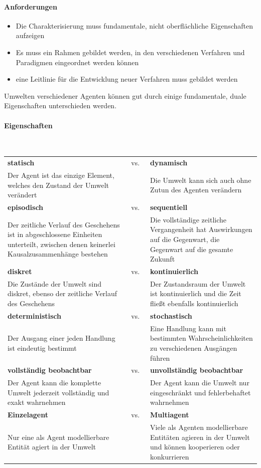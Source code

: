 \paragraph{Anforderungen}
\begin{itemize}
	\item Die Charakterisierung muss fundamentale, nicht oberflächliche Eigenschaften aufzeigen
	\item Es muss ein Rahmen gebildet werden, in den verschiedenen Verfahren und Paradigmen eingeordnet werden können
	\item eine Leitlinie für die Entwicklung neuer Verfahren muss gebildet werden
\end{itemize}
Umwelten verschiedener Agenten können gut durch einige fundamentale, duale Eigenschaften unterschieden werden.
\paragraph{Eigenschaften} \mbox{}
\vspace{1em} \\
\begin{tabular}{p{} p{} p{}}
\textbf{statisch} & \centering vs.\ & \textbf{dynamisch}\\
Der Agent ist das einzige Element, welches den Zustand der Umwelt verändert
& &
Die Umwelt kann sich auch ohne Zutun des Agenten verändern
\\
\textbf{episodisch} & \centering vs.\ & \textbf{sequentiell}\\
Der zeitliche Verlauf des Geschehens  ist in abgeschlossene Einheiten unterteilt, zwischen denen keinerlei Kausalzusammenhänge bestehen
& &
Die vollständige zeitliche Vergangenheit hat Auswirkungen auf die Gegenwart, die Gegenwart auf die gesamte Zukunft
\\
\textbf{diskret} & \centering vs.\ & \textbf{kontinuierlich}\\
Die Zustände der Umwelt sind diskret, ebenso der zeitliche Verlauf des Geschehens
& &
Der Zustandsraum der Umwelt ist kontinuierlich und die Zeit fließt ebenfalls kontinuierlich
\\
\textbf{deterministisch} & \centering vs.\ & \textbf{stochastisch}\\
Der Ausgang einer jeden Handlung ist eindeutig bestimmt
& &
Eine Handlung kann mit bestimmten Wahrscheinlichkeiten zu verschiedenen Ausgängen führen
\\
\textbf{vollständig beobachtbar} & \centering vs.\ & \textbf{unvollständig beobachtbar}\\
Der Agent kann die komplette Umwelt jederzeit vollständig und exakt wahrnehmen
& &
Der Agent kann die Umwelt nur eingeschränkt und fehlerbehaftet wahrnehmen
\\
\textbf{Einzelagent} & \centering vs.\ & \textbf{Multiagent}\\
Nur eine als Agent modellierbare Entität agiert in der Umwelt
& &
Viele als Agenten modellierbare Entitäten agieren in der Umwelt und können kooperieren oder konkurrieren
\end{tabular}
